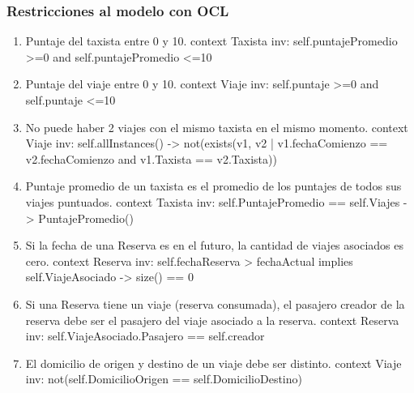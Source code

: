 \subsubsection{Restricciones al modelo con OCL}
\begin{enumerate}
	\item \begin{ocl}{Puntaje del taxista entre 0 y 10.}
		  context Taxista
		  inv: self.puntajePromedio >=0 and
		       self.puntajePromedio <=10
		\end{ocl}
	
	\item \begin{ocl}{Puntaje del viaje entre 0 y 10.}
		  context Viaje
		  inv: self.puntaje >=0 and
		       self.puntaje <=10
		\end{ocl}

	\item \begin{ocl}{No puede haber 2 viajes con el mismo taxista en el mismo momento.}
		  context Viaje
		  inv: self.allInstances() -> not(exists(v1, v2 | v1.fechaComienzo == v2.fechaComienzo 
		                                            and v1.Taxista == v2.Taxista))
		\end{ocl}

	\item \begin{ocl}{Puntaje promedio de un taxista es el promedio de los puntajes de todos sus viajes puntuados.}
		  context Taxista
		  inv: self.PuntajePromedio == self.Viajes -> PuntajePromedio()
		\end{ocl}

	\item \begin{ocl}{Si la fecha de una Reserva es en el futuro, la cantidad de viajes asociados es cero.}
		  context Reserva
		  inv: self.fechaReserva > fechaActual implies self.ViajeAsociado -> size() == 0
		\end{ocl}

	\item \begin{ocl}{Si una Reserva tiene un viaje (reserva consumada), el pasajero creador de la reserva debe ser el pasajero del viaje asociado a la reserva.}
		  context Reserva
		  inv: self.ViajeAsociado.Pasajero == self.creador
		\end{ocl}

	\item \begin{ocl}{El domicilio de origen y destino de un viaje debe ser distinto.}
		  context Viaje
		  inv: not(self.DomicilioOrigen == self.DomicilioDestino)
		\end{ocl}


\end{enumerate}
